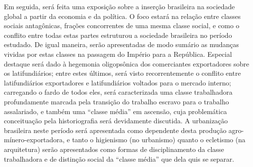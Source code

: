 Em seguida, será feita uma exposição sobre a inserção brasileira na sociedade global a partir da economia e da política. O foco estará na relação entre classes sociais antagônicas, frações concorrentes de uma mesma classe social, e como o conflito entre todas estas partes estruturou a sociedade brasileira no período estudado. De igual maneira, serão apresentadas de modo sumário as mudanças vividas por estas classes na passagem do Império para a República. Especial destaque será dado à hegemonia oligopsônica dos comerciantes exportadores sobre os latifundiários; entre estes últimos, será visto recorrentemente o conflito entre latifundiários exportadores e latifundiários voltados para o mercado interno; carregando o fardo de todos eles, será caracterizada uma classe trabalhadora profundamente marcada pela transição do trabalho escravo para o trabalho assalariado, e também uma ``classe média'' em ascensão, cuja problemática conceituação pela historiografia será devidamente discutida. A  urbanização brasileira neste período será apresentada como dependente desta produção agro-mínero-exportadora, e tanto o higienismo (no urbanismo) quanto o ecletismo (na arquitetura) serão apresentados como formas de disciplinamento da classe trabalhadora e de distinção social da ``classe média'' que dela quis se separar. 

